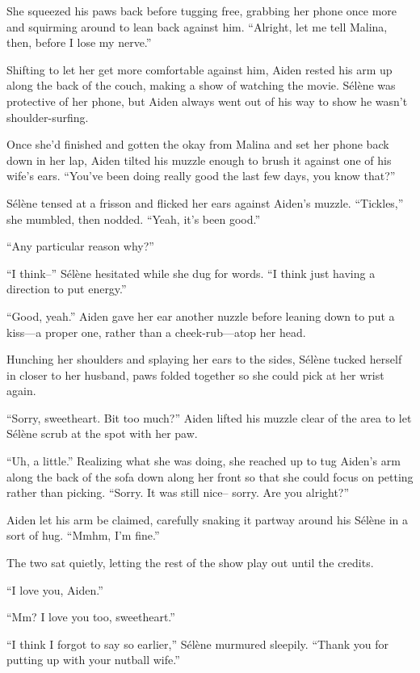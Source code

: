 She squeezed his paws back before tugging free, grabbing her phone once more and squirming around to lean back against him. ``Alright, let me tell Malina, then, before I lose my nerve.''

Shifting to let her get more comfortable against him, Aiden rested his arm up along the back of the couch, making a show of watching the movie. Sélène was protective of her phone, but Aiden always went out of his way to show he wasn't shoulder-surfing.

Once she'd finished and gotten the okay from Malina and set her phone back down in her lap, Aiden tilted his muzzle enough to brush it against one of his wife's ears. ``You've been doing really good the last few days, you know that?''

Sélène tensed at a frisson and flicked her ears against Aiden's muzzle. ``Tickles,'' she mumbled, then nodded. ``Yeah, it's been good.''

``Any particular reason why?''

``I think--'' Sélène hesitated while she dug for words. ``I think just having a direction to put energy.''

``Good, yeah.'' Aiden gave her ear another nuzzle before leaning down to put a kiss---a proper one, rather than a cheek-rub---atop her head.

Hunching her shoulders and splaying her ears to the sides, Sélène tucked herself in closer to her husband, paws folded together so she could pick at her wrist again.

``Sorry, sweetheart. Bit too much?'' Aiden lifted his muzzle clear of the area to let Sélène scrub at the spot with her paw.

``Uh, a little.'' Realizing what she was doing, she reached up to tug Aiden's arm along the back of the sofa down along her front so that she could focus on petting rather than picking. ``Sorry. It was still nice-- sorry. Are you alright?''

Aiden let his arm be claimed, carefully snaking it partway around his Sélène in a sort of hug. ``Mmhm, I'm fine.''

The two sat quietly, letting the rest of the show play out until the credits.

``I love you, Aiden.''

``Mm? I love you too, sweetheart.''

``I think I forgot to say so earlier,'' Sélène murmured sleepily. ``Thank you for putting up with your nutball wife.''

